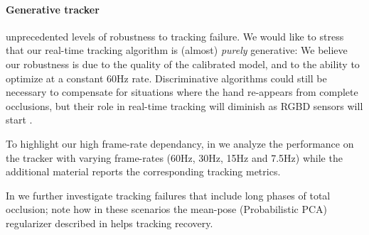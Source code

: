 \paragraph{Generative tracker}
 unprecedented levels of robustness to tracking failure.
We would like to stress that our real-time tracking algorithm is (almost) \emph{purely} generative: 
We believe our robustness is due to the quality of the calibrated model, and to the ability to optimize at a constant 60Hz rate.
% 
Discriminative algorithms could still be necessary to compensate for situations where the hand re-appears from complete occlusions, but their role in real-time tracking will diminish as RGBD sensors will start .
% 
\begin{draft}
To highlight our high frame-rate dependancy, in \VideoLimFramerate{} we analyze the performance on the tracker with varying frame-rates (60Hz, 30Hz, 15Hz and 7.5Hz) while the additional material reports the corresponding tracking metrics.
\end{draft}  
% 
\begin{draft}
In \VideoLimOcclusions{} we further investigate tracking failures that include long phases of total occlusion; note how in these scenarios the mean-pose (Probabilistic PCA) regularizer described in \cite[Eq.6]{tagliasacchi2015robust} helps tracking recovery.
\end{draft}


